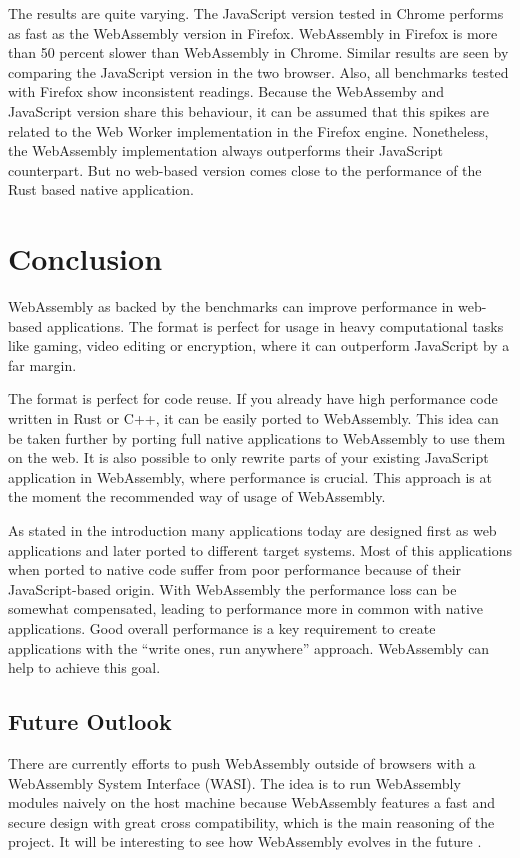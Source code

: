 \vspace{-0.3cm} The results are quite varying. The JavaScript version tested in Chrome performs as fast as the WebAssembly version in Firefox. WebAssembly in Firefox is more than 50 percent slower than WebAssembly in Chrome. Similar results are seen by comparing the JavaScript version in the two browser. Also, all benchmarks tested with Firefox show inconsistent readings. Because the WebAssemby and JavaScript version share this behaviour, it can be assumed that this spikes are related to the Web Worker implementation in the Firefox engine. Nonetheless, the WebAssembly implementation always outperforms their JavaScript counterpart. But no web-based version comes close to the performance of the Rust based native application. 

\newpage

\section{Conclusion}
WebAssembly as backed by the benchmarks can improve performance in web-based applications. The format is perfect for usage in heavy computational tasks like gaming, video editing or encryption, where it can outperform JavaScript by a far margin. 

The format is perfect for code reuse. If you already have high performance code written in Rust or C++, it can be easily ported to WebAssembly. This idea can be taken further by porting full native applications to WebAssembly to use them on the web.
It is also possible to only rewrite parts of your existing JavaScript application in WebAssembly, where performance is crucial. This approach is at the moment the recommended way of usage of WebAssembly.

As stated in the introduction many applications today are designed first as web applications and later ported to different target systems. Most of this applications when ported to native code suffer from poor performance because of their JavaScript-based origin. With WebAssembly the performance loss can be somewhat compensated, leading to performance more in common with native applications. Good overall performance is a key requirement to create applications with the ``write ones, run anywhere'' approach. WebAssembly can help to achieve this goal.

\subsection{Future Outlook}
There are currently efforts to push WebAssembly outside of browsers with a WebAssembly System Interface (WASI). The idea is to run WebAssembly modules naively on the host machine because WebAssembly features a fast and secure design with great cross compatibility, which is the main reasoning of the project. It will be interesting to see how WebAssembly evolves in the future \cite{wasi}.




